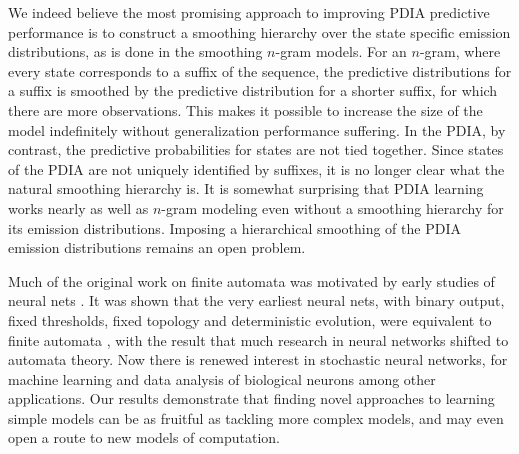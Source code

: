 We indeed believe the most promising approach to improving PDIA predictive performance is to construct a smoothing hierarchy over the state specific emission distributions, as is done in the smoothing $n$-gram models.  For an $n$-gram, where every state corresponds to a suffix of the sequence, the predictive distributions for a suffix is smoothed by the predictive distribution for a shorter suffix, for which there are more observations.  This makes it possible to increase the size of the model indefinitely without generalization performance suffering.  In the PDIA, by contrast, the predictive probabilities for states are not tied together.  Since states of the PDIA are not uniquely identified by suffixes, it is no longer clear what the natural smoothing hierarchy is.  It is somewhat surprising that PDIA learning works nearly as well as $n$-gram modeling even without a smoothing hierarchy for its emission distributions.  Imposing a hierarchical smoothing of the PDIA emission distributions remains an open problem. 


Much of the original work on finite automata was motivated by early studies of neural nets \cite{Hopcroft1979}. It was shown that the very earliest neural nets, with binary output, fixed thresholds, fixed topology and deterministic evolution, were equivalent to finite automata \cite{Kleene1956}, with the result that much research in neural networks shifted to automata theory.  Now there is renewed interest in stochastic neural networks, for machine learning \cite{Hinton2006} and data analysis of biological neurons \cite{Pillow2008} among other applications.  Our results demonstrate that finding novel approaches to learning simple models can be as fruitful as tackling more complex models, and may even open a route to new models of computation.